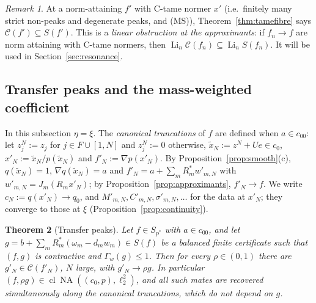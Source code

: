 \documentclass[10pt]{amsart}
\newtheorem{theorem}{Theorem}[section]
\theoremstyle{definition}
\theoremstyle{remark}
\newtheorem{remark}[theorem]{Remark}
\newcommand{\NA}{\operatorname{NA}}
\newcommand{\Cset}{\mathcal C}
\newcommand{\Li}{\operatorname*{Li}}
\newcommand{\cl}{\operatorname{cl}}
\begin{document}
\begin{remark}\label{rem:tameNA}
At a norm-attaining $f'$ with C-tame normer $x'$ (i.e.\ finitely many
strict non-peaks and degenerate peaks, and (MS)), Theorem~\ref{thm:tamefibre}
says $\Cset(f')\subseteq S(f')$.  This is a \emph{linear obstruction at the
approximants}: if $f_n\to f$ are norm attaining with C-tame normers, then
$\Li_n\Cset(f_n)\subseteq\Li_nS(f_n)$.  It will be used in
Section~\ref{sec:resonance}.
\end{remark}

\subsection{Transfer peaks and the mass-weighted coefficient}
In this subsection $\eta=\xi$.  The \emph{canonical truncations} of $f$
are defined when $a\in c_{00}$: let $z^N_j:=z_j$ for $j\in F\cup[1,N]$ and
$z^N_j:=0$ otherwise, $\tilde x_N:=z^N+Ue\in c_0$, $x'_N:=\tilde
x_N/p(\tilde x_N)$ and $f'_N:=\nabla p(x'_N)$.  By
Proposition~\ref{prop:smooth}(c), $q(\tilde x_N)=1$, $\nabla q(\tilde
x_N)=a$ and $f'_N=a+\sum_mR_m^*w'_{m,N}$ with $w'_{m,N}=J_m(R_mx'_N)$; by
Proposition~\ref{prop:approximants}, $f'_N\to f$.  We write
$c_N:=q(x'_N)\to q_0$, and $M'_{m,N},C'_{m,N},\sigma'_{m,N},\dots$ for the
data at $x'_N$; they converge to those at $\xi$
(Proposition~\ref{prop:continuity}).

\begin{theorem}[Transfer peaks]\label{thm:transfer}
Let $f\in S_{p^*}$ with $a\in c_{00}$, and let
$g=b+\sum_mR_m^*(\omega_m-d_mw_m)\in S(f)$ be a balanced finite certificate
such that $(f,g)$ is contractive and $\Gamma_w(g)\le1$.  Then for every
$\rho\in(0,1)$ there are $g'_N\in\Cset(f'_N)$, $N$ large, with
$g'_N\to\rho g$.  In particular $(f,\rho g)\in\cl\NA((c_0,p),\ell_2^2)$, and
all such mates are recovered simultaneously along the canonical truncations,
which do not depend on $g$.
\end{theorem}
\end{document}
